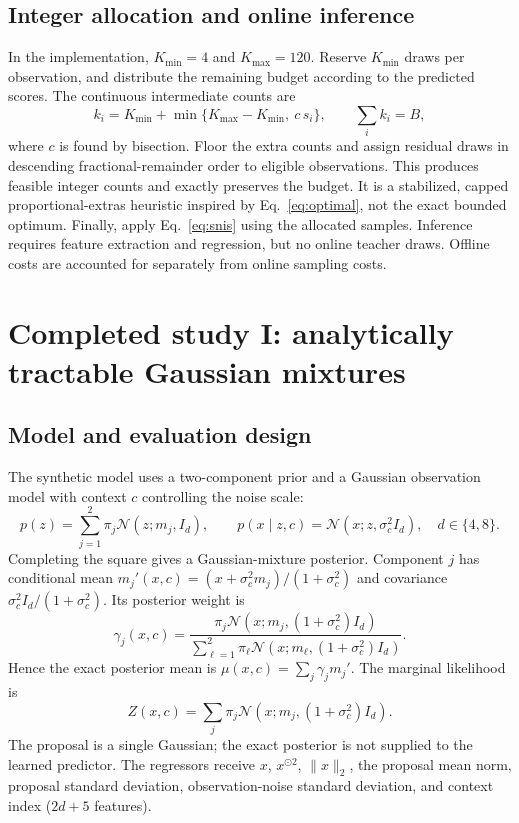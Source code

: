 \documentclass[11pt,letterpaper]{article}
\newcommand{\N}{\mathcal N}
\newcommand{\norm}[1]{\lVert #1\rVert_2}
\begin{document}
\subsection{Integer allocation and online inference}
In the implementation, $K_{\min}=4$ and $K_{\max}=120$. Reserve $K_{\min}$ draws per observation, and distribute the remaining budget according to the predicted scores. The continuous intermediate counts are
\begin{equation}
 k_i=K_{\min}+\min\{K_{\max}-K_{\min},\ c\,s_i\},\qquad\sum_i k_i=B,
\end{equation}
where $c$ is found by bisection. Floor the extra counts and assign residual draws in descending fractional-remainder order to eligible observations. This produces feasible integer counts and exactly preserves the budget. It is a stabilized, capped proportional-extras heuristic inspired by Eq.~\eqref{eq:optimal}, not the exact bounded optimum. Finally, apply Eq.~\eqref{eq:snis} using the allocated samples. Inference requires feature extraction and regression, but no online teacher draws. Offline costs are accounted for separately from online sampling costs.

\clearpage
\section{Completed study I: analytically tractable Gaussian mixtures}
\subsection{Model and evaluation design}
The synthetic model uses a two-component prior and a Gaussian observation model with context $c$ controlling the noise scale:
\begin{equation}
 p(z)=\sum_{j=1}^2\pi_j\N(z;m_j,I_d),\qquad p(x\mid z,c)=\N(x;z,\sigma_c^2 I_d),\quad d\in\{4,8\}.
\end{equation}
Completing the square gives a Gaussian-mixture posterior. Component $j$ has conditional mean $m_j'(x,c)=(x+\sigma_c^2m_j)/(1+\sigma_c^2)$ and covariance $\sigma_c^2 I_d/(1+\sigma_c^2)$. Its posterior weight is
\begin{equation}
 \gamma_j(x,c)=\frac{\pi_j\N(x;m_j,(1+\sigma_c^2)I_d)}{\sum_{\ell=1}^2\pi_\ell\N(x;m_\ell,(1+\sigma_c^2)I_d)}.
\end{equation}
Hence the exact posterior mean is $\mu(x,c)=\sum_j\gamma_j m_j'$. The marginal likelihood is
\[Z(x,c)=\sum_j\pi_j\N(x;m_j,(1+\sigma_c^2)I_d).\] The proposal is a single Gaussian; the exact posterior is not supplied to the learned predictor. The regressors receive $x$, $x^{\odot 2}$, $\norm{x}$, the proposal mean norm, proposal standard deviation, observation-noise standard deviation, and context index ($2d+5$ features).
\end{document}
